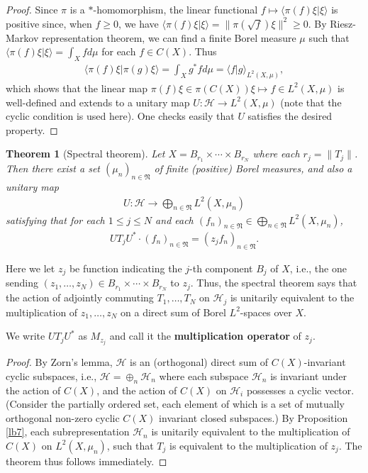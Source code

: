 \documentclass[12pt,b5paper,notitlepage]{article}
\theoremstyle{definition}
\theoremstyle{plain}
\newtheorem{thm}[df]{Theorem}
\newcommand{\fk}{\mathfrak}
\newcommand{\mc}{\mathcal}
\newcommand{\bk}[1]{\langle {#1}\rangle}
\numberwithin{equation}{section}
\begin{document}
\begin{proof}
Since $\pi$ is a $*$-homomorphism, the linear functional $f\mapsto \bk{\pi(f)\xi|\xi}$ is positive since, when $f\geq 0$, we have $\bk{\pi(f)\xi|\xi}=\lVert \pi(\sqrt f)\xi\lVert^2\geq 0$. By Riesz-Markov representation theorem, we can find a finite Borel measure $\mu$ such that $\bk{\pi(f)\xi|\xi}=\int_Xfd\mu$ for each $f\in C(X)$. Thus
\begin{align*}
\bk{\pi(f)\xi|\pi(g)\xi}=\int_Xg^*fd\mu=\bk{f|g}_{L^2(X,\mu)},
\end{align*}
which shows that the linear map $\pi(f)\xi\in\pi(C(X))\xi\mapsto f\in L^2(X,\mu)$ is well-defined and extends to a unitary map $U:\mc H\rightarrow L^2(X,\mu)$ (note that the cyclic condition is used here). One checks easily that $U$ satisfies the desired property.
\end{proof}


\begin{thm}[Spectral theorem]\label{lb8}
Let $X=B_{r_1}\times\cdots\times B_{r_N}$ where each $r_j=\lVert T_j\lVert$. Then there exist a set $(\mu_n)_{n\in\fk N}$ of finite (positive) Borel measures, and also a unitary map
\begin{align*}
U:\mc H\rightarrow\bigoplus_{n\in\fk N} L^2(X,\mu_n)
\end{align*}
satisfying that for each $1\leq j\leq N$ and each $(f_n)_{n\in\fk N}\in \bigoplus_{n\in\fk N} L^2(X,\mu_n)$,
\begin{align}
UT_jU^*\cdot (f_n)_{n\in\fk N}=(z_jf_n)_{n\in\fk N}.\label{eq10}
\end{align}
\end{thm}
Here we let $z_j$ be function indicating the $j$-th component $B_j$ of $X$, i.e., the one sending $(z_1,\dots,z_N)\in B_{r_1}\times\cdots\times B_{r_N}$ to $z_j$. Thus, the spectral theorem says that the action of adjointly commuting $T_1,\dots,T_N$ on $\mc H_j$ is unitarily equivalent to the multiplication of $z_1,\dots,z_N$ on a direct sum of Borel $L^2$-spaces over $X$.

We write $UT_jU^*$ as $M_{z_j}$ and call it the \textbf{multiplication operator}  of $z_j$.

\begin{proof}
By Zorn's lemma, $\mc H$ is an (orthogonal) direct sum of $C(X)$-invariant cyclic subspaces, i.e., $\mc H=\oplus_n\mc H_n$ where each subspace $\mc H_n$ is invariant under the action of $C(X)$, and the action of $C(X)$ on $\mc H_i$ possesses a cyclic vector. (Consider the partially ordered set, each element of which is a set of mutually orthogonal non-zero cyclic $C(X)$ invariant closed subspaces.)  By Proposition \ref{lb7}, each subrepresentation $\mc H_n$ is unitarily equivalent  to the multiplication of $C(X)$ on $L^2(X,\mu_n)$, such that $T_j$ is equivalent to the multiplication of $z_j$. The theorem thus follows immediately.
\end{proof}
\end{document}
